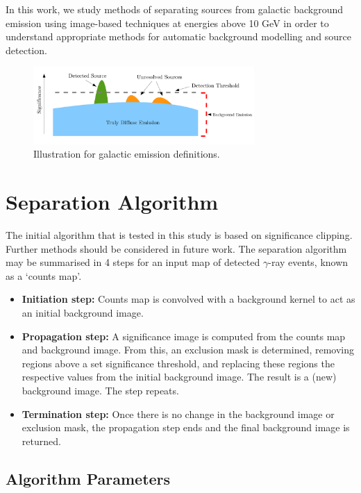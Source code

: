 \documentclass{PoS}
\begin{document}
In this work, we study methods of separating sources from galactic background emission using image-based techniques at energies above 10 GeV in order to understand appropriate methods for automatic background modelling and source detection.

\begin{figure}[h!]
  \centering
      \includegraphics[width=0.75\textwidth]{figures/definitions.png}
  \caption{Illustration for galactic emission definitions.}
\end{figure}

\section{Separation Algorithm}


The initial algorithm that is tested in this study is based on significance clipping. Further methods should be considered in future work. The separation algorithm may be summarised in 4 steps for an input map of detected $\gamma$-ray events, known as a `counts map'.

\begin{itemize}
\item{\textbf{Initiation step:} Counts map is convolved with a background kernel to act as an initial background image.}
\item{\textbf{Propagation step:} A significance image is computed from the counts map and background image. From this, an exclusion mask is determined, removing regions above a set significance threshold, and replacing these regions the respective values from the initial background image. The result is a (new) background image. The step repeats.}
\item{\textbf{Termination step:} Once there is no change in the background image or exclusion mask, the propagation step ends and the final background image is returned.}
\end{itemize}


\subsection{Algorithm Parameters}
\end{document}
